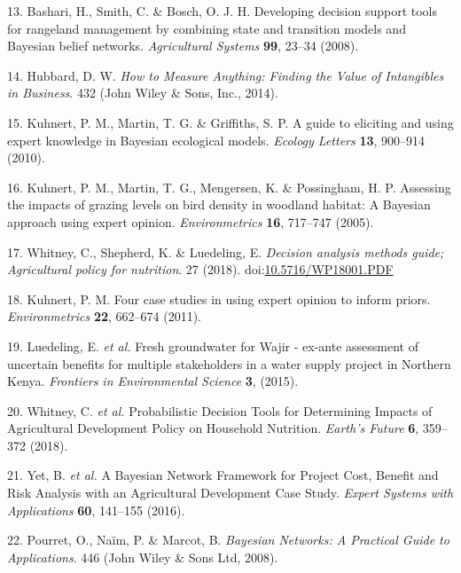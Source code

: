 \documentclass[12pt,oneside]{article}
\begin{document}
\leavevmode\hypertarget{ref-Bashari_et_al_2008}{}%
13. Bashari, H., Smith, C. \& Bosch, O. J. H. Developing decision support tools for rangeland management by combining state and transition models and Bayesian belief networks. \emph{Agricultural Systems} \textbf{99}, 23--34 (2008).

\leavevmode\hypertarget{ref-Hubbard_2014}{}%
14. Hubbard, D. W. \emph{How to Measure Anything: Finding the Value of Intangibles in Business}. 432 (John Wiley \& Sons, Inc., 2014).

\leavevmode\hypertarget{ref-Kuhnert_et_al_2010}{}%
15. Kuhnert, P. M., Martin, T. G. \& Griffiths, S. P. A guide to eliciting and using expert knowledge in Bayesian ecological models. \emph{Ecology Letters} \textbf{13}, 900--914 (2010).

\leavevmode\hypertarget{ref-Kuhnert_et_al_2005}{}%
16. Kuhnert, P. M., Martin, T. G., Mengersen, K. \& Possingham, H. P. Assessing the impacts of grazing levels on bird density in woodland habitat: A Bayesian approach using expert opinion. \emph{Environmetrics} \textbf{16}, 717--747 (2005).

\leavevmode\hypertarget{ref-Whitney_et_al_2018}{}%
17. Whitney, C., Shepherd, K. \& Luedeling, E. \emph{Decision analysis methods guide; Agricultural policy for nutrition}. 27 (2018). doi:\href{https://doi.org/10.5716/WP18001.PDF}{10.5716/WP18001.PDF}

\leavevmode\hypertarget{ref-Kuhnert_2011}{}%
18. Kuhnert, P. M. Four case studies in using expert opinion to inform priors. \emph{Environmetrics} \textbf{22}, 662--674 (2011).

\leavevmode\hypertarget{ref-Luedeling_et_al_2015}{}%
19. Luedeling, E. \emph{et al.} Fresh groundwater for Wajir - ex-ante assessment of uncertain benefits for multiple stakeholders in a water supply project in Northern Kenya. \emph{Frontiers in Environmental Science} \textbf{3}, (2015).

\leavevmode\hypertarget{ref-Whitney_et_al_2018a}{}%
20. Whitney, C. \emph{et al.} Probabilistic Decision Tools for Determining Impacts of Agricultural Development Policy on Household Nutrition. \emph{Earth's Future} \textbf{6}, 359--372 (2018).

\leavevmode\hypertarget{ref-Yet_et_al_2016}{}%
21. Yet, B. \emph{et al.} A Bayesian Network Framework for Project Cost, Benefit and Risk Analysis with an Agricultural Development Case Study. \emph{Expert Systems with Applications} \textbf{60}, 141--155 (2016).

\leavevmode\hypertarget{ref-Pourret_et_al_2008}{}%
22. Pourret, O., Naïm, P. \& Marcot, B. \emph{Bayesian Networks: A Practical Guide to Applications}. 446 (John Wiley \& Sons Ltd, 2008).
\end{document}
